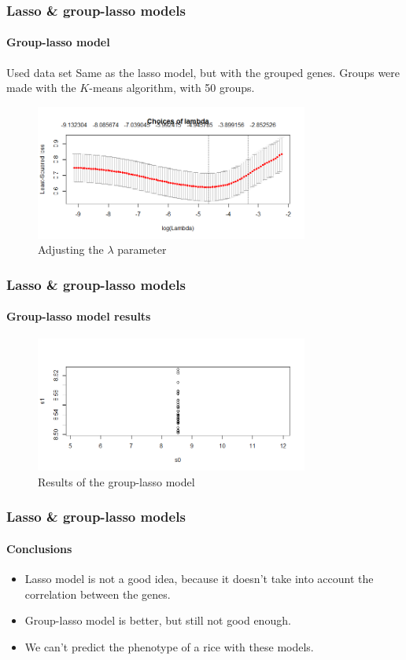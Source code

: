 \documentclass[12pt, english]{beamer}
\begin{document}
\begin{frame}
\frametitle{Lasso \& group-lasso models}
\framesubtitle{Group-lasso model}
\begin{exampleblock}{Used data set}
Same as the lasso model, but with the grouped genes. Groups were made with the \(K\)-means
algorithm, with \num{50} groups.
\end{exampleblock}
\begin{figure}
    \centering
    \includegraphics[width=0.8\textwidth]{glasso_l.png}
    \caption{Adjusting the \(\lambda\) parameter}
\end{figure}
\end{frame}
\begin{frame}
\frametitle{Lasso \& group-lasso models}
\framesubtitle{Group-lasso model results}
\begin{figure}[H]
    \centering
    \includegraphics[width=0.8\textwidth]{group_lasso.png}
    \caption{Results of the group-lasso model}
\end{figure}
\end{frame}
\begin{frame}
\frametitle{Lasso \& group-lasso models}
\framesubtitle{Conclusions}
\begin{itemize}
    \item Lasso model is not a good idea, because it doesn't take into account the correlation between the genes.
    \item Group-lasso model is better, but still not good enough.
    \item We can't predict the phenotype of a rice with these models.
\end{itemize}
\end{frame}
\end{document}
